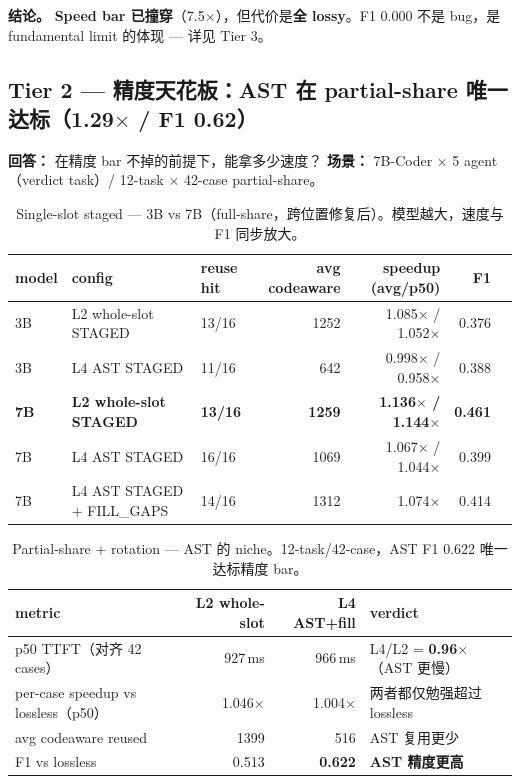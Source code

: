 \documentclass[11pt,a4paper]{article}
\begin{document}
\textbf{结论。} \textbf{Speed bar 已撞穿}（7.5$\times$），但代价是\textbf{全 lossy}。F1 0.000 不是 bug，是 fundamental limit 的体现 --- 详见 Tier 3。

\subsection*{Tier 2 --- 精度天花板：AST 在 partial-share 唯一达标（1.29$\times$ / F1 0.62）}

\textbf{回答：} 在精度 bar 不掉的前提下，能拿多少速度？
\textbf{场景：} 7B-Coder × 5 agent（verdict task）/ 12-task × 42-case partial-share。

\begin{table}[h]
\centering\small
\begin{tabular}{@{}lllrrrr@{}}
\toprule
\textbf{model} & \textbf{config} & \textbf{reuse hit} & \textbf{avg codeaware} & \textbf{speedup (avg/p50)} & \textbf{F1} \\
\midrule
3B & L2 whole-slot STAGED      & 13/16 & 1252  & 1.085$\times$ / 1.052$\times$ & 0.376 \\
3B & L4 AST STAGED             & 11/16 & 642   & 0.998$\times$ / 0.958$\times$ & 0.388 \\
\textbf{7B} & \textbf{L2 whole-slot STAGED} & \textbf{13/16} & \textbf{1259} & \textbf{1.136$\times$ / 1.144$\times$} & \textbf{0.461} \\
7B & L4 AST STAGED             & 16/16 & 1069  & 1.067$\times$ / 1.044$\times$ & 0.399 \\
7B & L4 AST STAGED + FILL\_GAPS & 14/16 & 1312 & 1.074$\times$                 & 0.414 \\
\bottomrule
\end{tabular}
\caption{Single-slot staged --- 3B vs 7B（full-share，跨位置修复后）。模型越大，速度与 F1 同步放大。}
\end{table}

\begin{table}[h]
\centering\small
\begin{tabular}{@{}lrrl@{}}
\toprule
\textbf{metric} & \textbf{L2 whole-slot} & \textbf{L4 AST+fill} & \textbf{verdict} \\
\midrule
p50 TTFT（对齐 42 cases）                  & 927\,ms & 966\,ms & L4/L2 = \textbf{0.96$\times$}（AST 更慢） \\
per-case speedup vs lossless（p50）         & 1.046$\times$ & 1.004$\times$ & 两者都仅勉强超过 lossless \\
avg codeaware reused                        & 1399   & 516    & AST 复用更少 \\
F1 vs lossless                              & 0.513  & \textbf{0.622} & \textbf{AST 精度更高} \\
\bottomrule
\end{tabular}
\caption{Partial-share + rotation --- AST 的 niche。12-task/42-case，AST F1 0.622 唯一达标精度 bar。}
\end{table}
\end{document}
